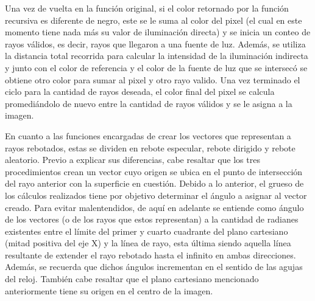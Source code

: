 \documentclass[conference]{IEEEtran}
\begin{document}
Una vez de vuelta en la función original, si el color retornado por la función recursiva es diferente de negro, este se le suma al color del pixel (el cual en este momento tiene nada más su valor de iluminación directa) y se inicia un conteo de rayos válidos, es decir, rayos que llegaron a una fuente de luz. Además, se utiliza la distancia total recorrida para calcular la intensidad de la iluminación indirecta y junto con el color de referencia y el color de la fuente de luz que se intersecó se obtiene otro color para sumar al pixel y otro rayo valido. Una vez terminado el ciclo para la cantidad de rayos deseada, el color final del pixel se calcula promediándolo de nuevo entre la cantidad de rayos válidos y se le asigna a la imagen.  

En cuanto a las funciones encargadas de crear los vectores que representan a rayos rebotados, estas se dividen en rebote especular, rebote dirigido y rebote aleatorio. Previo a explicar sus diferencias, cabe resaltar que los tres procedimientos crean un vector cuyo origen se ubica en el punto de intersección del rayo anterior con la superficie en cuestión. Debido a lo anterior, el grueso de los cálculos realizados tiene por objetivo determinar el ángulo a asignar al vector creado. Para evitar malentendidos, de aquí en adelante se entiende como ángulo de los vectores (o de los rayos que estos representan) a la cantidad de radianes existentes entre el límite del primer y cuarto cuadrante del plano cartesiano (mitad positiva del eje X) y la línea de rayo, esta última siendo aquella línea resultante de extender el rayo rebotado hasta el infinito en ambas direcciones. Además, se recuerda que dichos ángulos incrementan en el sentido de las agujas del reloj. También cabe resaltar que el plano cartesiano mencionado anteriormente tiene su origen en el centro de la imagen.
\end{document}
